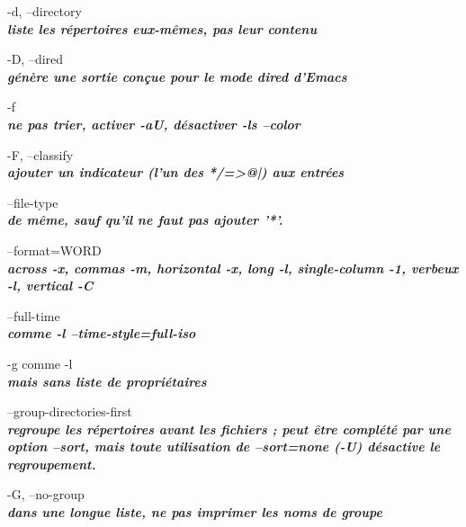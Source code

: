 \documentclass{article}
\begin{document}
       \par-d, --directory\\
              \textit{\textbf{liste les répertoires eux-mêmes, pas leur contenu}}\\

      \par -D, --dired\\
              \textit{\textbf{génère une sortie conçue pour le mode dired d'Emacs}}\\

       \par-f \\
		 \textit{\textbf{ne pas trier, activer -aU, désactiver -ls --color}}\\

       \par -F, --classify\\
               \textit{\textbf{ajouter un indicateur (l'un des */=>@|) aux entrées}}\\

      \par --file-type\\
              \textit{\textbf{de même, sauf qu'il ne faut pas ajouter '*'.}}\\

       \par --format=WORD\\
              \textit{\textbf{across -x, commas -m, horizontal -x, long -l, single-column -1,
              verbeux -l, vertical -C}}\\

       \par --full-time\\
              \textit{\textbf{comme -l --time-style=full-iso}}\\

       \par-g comme -l\\
	 \textit{\textbf{mais sans liste de propriétaires}}\\

       \par --group-directories-first\\
              \textit{\textbf{regroupe les répertoires avant les fichiers ;
		peut être complété par une option --sort, mais toute utilisation de
              --sort=none (-U) désactive le regroupement.}}\\

       \par -G, --no-group\\
               \textit{\textbf{dans une longue liste, ne pas imprimer les noms de groupe}}\\
\end{document}
